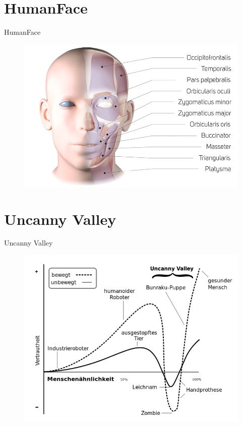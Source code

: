 \documentclass{beamer}
\begin{document}
\section{HumanFace}
\begin{frame}{HumanFace}
	\begin{figure}
		\centering
        \includegraphics[width=\textwidth,height=\textheight,keepaspectratio]{figures/facial_muscles.png}
		\label{fig:facial_muscles}
	\end{figure}
\end{frame}

\section{Uncanny Valley}
\begin{frame}{Uncanny Valley}
	\begin{figure}
		\centering
        \includegraphics[width=\textwidth,height=0.8\textheight,keepaspectratio]{figures/uncanny_valley.png}
		\label{fig:uncanny_valley}
	\end{figure}
\end{frame}
\end{document}
